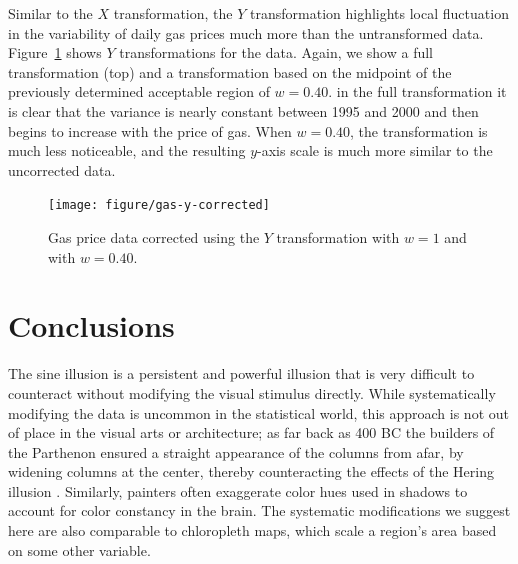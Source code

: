 \documentclass[12pt]{article}\usepackage[]{graphicx}\usepackage[]{color}
\begin{document}
Similar to the $X$ transformation, the $Y$ transformation highlights local fluctuation in the variability of daily gas prices much more than the untransformed data. Figure~\ref{fig:gasprices-y-correct} shows $Y$ transformations for the data. Again, we show a full transformation (top) and a transformation based on the midpoint of the previously determined acceptable region of $w=0.40$.
in the full transformation  it is clear that the variance is nearly constant between 1995 and 2000 and then begins to increase with the price of gas. When $w=0.40$, the transformation is much less noticeable, and the resulting $y$-axis scale is much more similar to the uncorrected data. 
\begin{figure}
\centering
\texttt{[image: figure/gas-y-corrected]}
\caption{Gas price data corrected using the $Y$ transformation with $w=1$ and with $w=0.40$. }
\label{fig:gasprices-y-correct}
\end{figure}


\section{Conclusions}
The sine illusion is a persistent and powerful illusion that is very difficult to counteract without modifying the visual stimulus directly. While systematically modifying the data is uncommon in the statistical world, this approach is not out of place in the visual arts or architecture; as far back as 400 BC the builders of the Parthenon ensured a straight appearance of the columns from afar, by widening columns at the center, thereby counteracting the effects of the Hering illusion \citep{naturalscenes,hering}. Similarly, painters often exaggerate color hues used in shadows to account for color constancy in the brain. The systematic modifications we suggest here are also comparable to chloropleth maps, which scale a region's area based on some other variable. 
\end{document}
